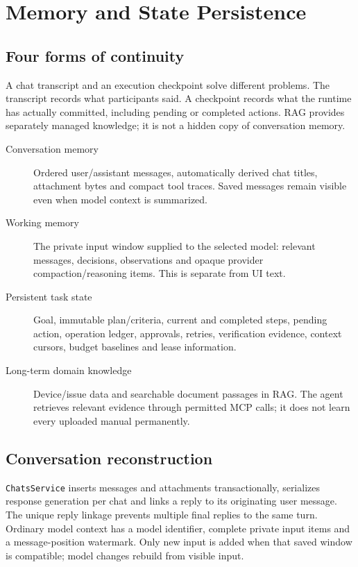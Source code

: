 \chapter{Memory and State Persistence}
\section{Four forms of continuity}
A chat transcript and an execution checkpoint solve different problems. The transcript records what participants said. A checkpoint records what the runtime has actually committed, including pending or completed actions. RAG provides separately managed knowledge; it is not a hidden copy of conversation memory.
\begin{center}\end{center}
\begin{description}
\item[Conversation memory] Ordered user/assistant messages, automatically derived chat titles, attachment bytes and compact tool traces. Saved messages remain visible even when model context is summarized.
\item[Working memory] The private input window supplied to the selected model: relevant messages, decisions, observations and opaque provider compaction/reasoning items. This is separate from UI text.
\item[Persistent task state] Goal, immutable plan/criteria, current and completed steps, pending action, operation ledger, approvals, retries, verification evidence, context cursors, budget baselines and lease information.
\item[Long-term domain knowledge] Device/issue data and searchable document passages in RAG. The agent retrieves relevant evidence through permitted MCP calls; it does not learn every uploaded manual permanently.
\end{description}
\section{Conversation reconstruction}
\texttt{ChatsService} inserts messages and attachments transactionally, serializes response generation per chat and links a reply to its originating user message. The unique reply linkage prevents multiple final replies to the same turn. Ordinary model context has a model identifier, complete private input items and a message-position watermark. Only new input is added when that saved window is compatible; model changes rebuild from visible input.

